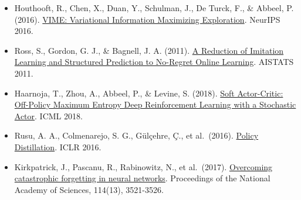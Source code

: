 \vspace{0.25em}
\begin{itemize}
\tightlist
\item
  Houthooft, R., Chen, X., Duan, Y., Schulman, J., De Turck, F., \& Abbeel, P. (2016). \href{https://arxiv.org/abs/1605.09674}{VIME: Variational Information Maximizing Exploration}. NeurIPS 2016.
\item
  Ross, S., Gordon, G. J., \& Bagnell, J. A. (2011). \href{https://proceedings.mlr.press/v15/ross11a.html}{A Reduction of Imitation Learning and Structured Prediction to No-Regret Online Learning}. AISTATS 2011.
\item
  Haarnoja, T., Zhou, A., Abbeel, P., \& Levine, S. (2018). \href{https://arxiv.org/abs/1801.01290}{Soft Actor-Critic: Off-Policy Maximum Entropy Deep Reinforcement Learning with a Stochastic Actor}. ICML 2018.
\item
  Rusu, A. A., Colmenarejo, S. G., Gülçehre, Ç., et al.~(2016). \href{https://arxiv.org/abs/1511.06295}{Policy Distillation}. ICLR 2016.
\item
  Kirkpatrick, J., Pascanu, R., Rabinowitz, N., et al.~(2017). \href{https://doi.org/10.1073/pnas.1611835114}{Overcoming catastrophic forgetting in neural networks}. Proceedings of the National Academy of Sciences, 114(13), 3521-3526.
\end{itemize}

\clearpage
